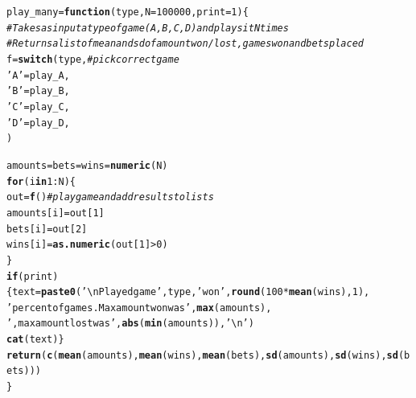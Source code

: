 \documentclass[12pt]{article}\usepackage[]{graphicx}\usepackage[]{color}
\makeatletter
\newcommand{\hlnum}[1]{\textcolor[rgb]{0.686,0.059,0.569}{#1}}%
\newcommand{\hlstr}[1]{\textcolor[rgb]{0.192,0.494,0.8}{#1}}%
\newcommand{\hlcom}[1]{\textcolor[rgb]{0.678,0.584,0.686}{\textit{#1}}}%
\newcommand{\hlopt}[1]{\textcolor[rgb]{0,0,0}{#1}}%
\newcommand{\hlstd}[1]{\textcolor[rgb]{0.345,0.345,0.345}{#1}}%
\newcommand{\hlkwa}[1]{\textcolor[rgb]{0.161,0.373,0.58}{\textbf{#1}}}%
\newcommand{\hlkwb}[1]{\textcolor[rgb]{0.69,0.353,0.396}{#1}}%
\newcommand{\hlkwc}[1]{\textcolor[rgb]{0.333,0.667,0.333}{#1}}%
\newcommand{\hlkwd}[1]{\textcolor[rgb]{0.737,0.353,0.396}{\textbf{#1}}}%
\newenvironment{kframe}{%
 \def\at@end@of@kframe{}%
 \ifinner\ifhmode%
  \def\at@end@of@kframe{\end{minipage}}%
  \begin{minipage}{\columnwidth}%
 \fi\fi%
 \def\FrameCommand##1{\hskip\@totalleftmargin \hskip-\fboxsep
 \colorbox{shadecolor}{##1}\hskip-\fboxsep
     \hskip-\linewidth \hskip-\@totalleftmargin \hskip\columnwidth}%
 \MakeFramed {\advance\hsize-\width
   \@totalleftmargin\z@ \linewidth\hsize
   \@setminipage}}%
 {\par\unskip\endMakeFramed%
 \at@end@of@kframe}
\newenvironment{knitrout}{}{} %
\makeatother
\begin{document}
\begin{knitrout}
\color{fgcolor}\begin{kframe}
\begin{alltt}
\hlstd{play_many} \hlkwb{=} \hlkwa{function}\hlstd{(}\hlkwc{type}\hlstd{,} \hlkwc{N}\hlstd{=}\hlnum{100000}\hlstd{,} \hlkwc{print}\hlstd{=}\hlnum{1}\hlstd{)\{}
  \hlcom{#Takes as input a type of game (A,B,C,D) and plays it N times}
  \hlcom{#Returns a list of mean and sd of amount won/lost, games won and bets placed}
  \hlstd{f} \hlkwb{=} \hlkwd{switch}\hlstd{(type,} \hlcom{#pick correct game}
         \hlstr{'A'} \hlstd{= play_A,}
         \hlstr{'B'} \hlstd{= play_B,}
         \hlstr{'C'} \hlstd{= play_C,}
         \hlstr{'D'} \hlstd{= play_D,}
         \hlstd{)}

  \hlstd{amounts} \hlkwb{=} \hlstd{bets} \hlkwb{=} \hlstd{wins} \hlkwb{=} \hlkwd{numeric}\hlstd{(N)}
  \hlkwa{for} \hlstd{(i} \hlkwa{in} \hlnum{1}\hlopt{:}\hlstd{N)\{}
    \hlstd{out} \hlkwb{=} \hlkwd{f}\hlstd{()} \hlcom{#play game and add results to lists}
    \hlstd{amounts[i]}\hlkwb{=}\hlstd{out[}\hlnum{1}\hlstd{]}
    \hlstd{bets[i]}\hlkwb{=}\hlstd{out[}\hlnum{2}\hlstd{]}
    \hlstd{wins[i]} \hlkwb{=} \hlkwd{as.numeric}\hlstd{( out[}\hlnum{1}\hlstd{]} \hlopt{>} \hlnum{0} \hlstd{)}
  \hlstd{\}}
  \hlkwa{if} \hlstd{(print)\{text} \hlkwb{=} \hlkwd{paste0}\hlstd{(}\hlstr{'\textbackslash{}nPlayed game '}\hlstd{, type,} \hlstr{' won '}\hlstd{,} \hlkwd{round}\hlstd{(}\hlnum{100}\hlopt{*}\hlkwd{mean}\hlstd{(wins),}\hlnum{1}\hlstd{),}
                          \hlstr{' percent of games. Max amount won was '}\hlstd{,} \hlkwd{max}\hlstd{(amounts),}
                          \hlstr{', max amount lost was '}\hlstd{,} \hlkwd{abs}\hlstd{(}\hlkwd{min}\hlstd{(amounts)),} \hlstr{'\textbackslash{}n'}\hlstd{)}
              \hlkwd{cat}\hlstd{(text)\}}
  \hlkwd{return}\hlstd{(}\hlkwd{c}\hlstd{(}\hlkwd{mean}\hlstd{(amounts),} \hlkwd{mean}\hlstd{(wins),} \hlkwd{mean}\hlstd{(bets),} \hlkwd{sd}\hlstd{(amounts),} \hlkwd{sd}\hlstd{(wins),} \hlkwd{sd}\hlstd{(bets)))}
\hlstd{\}}


\end{alltt}
\end{kframe}
\end{knitrout}
\end{document}
